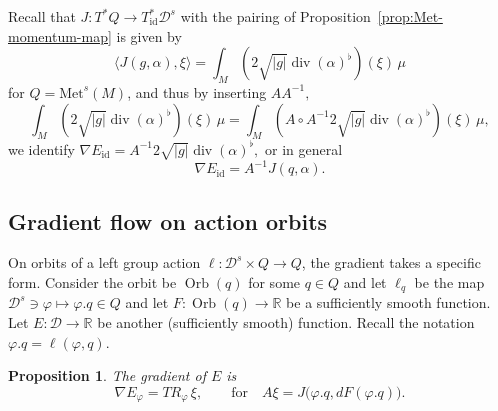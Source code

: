 \documentclass[a5paper,10pt,twoside]{article}
\newcommand{\R}{\ensuremath{\mathbb{R}}}
\newcommand{\cD}{\ensuremath{\mathcal{D}}}
\newcommand{\Met}{\ensuremath{\mathrm{Met}}}
\DeclareMathOperator*{\Orb}{Orb}
\DeclareMathOperator*{\Div}{div}
\DeclareMathOperator*{\id}{id}
\theoremstyle{plain}
\newtheorem{prop}[teo]{Proposition}
\theoremstyle{definition}
\theoremstyle{remark}
\begin{document}
Recall that $J:T^*Q\to T_{\id}^*\cD^s$ with the pairing of Proposition~\ref{prop:Met-momentum-map} is given by
\[
\langle J(g,\alpha),\xi\rangle=\int_M \left(2\sqrt{|g|}\Div(\alpha)^\flat\right)(\xi)\,\mu
\]
for $Q=\Met^s(M)$, and thus by inserting $AA^{-1},$
\[
\int_M \left(2\sqrt{|g|}\Div(\alpha)^\flat\right)(\xi)\,\mu = \int_M \left(A\circ A^{-1}2\sqrt{|g|}\Div(\alpha)^\flat\right)(\xi)\,\mu,
\]
we identify $\nabla E_{\id}=A^{-1}2\sqrt{|g|}\Div(\alpha)^\flat,$ or in general 
%
\begin{equation}
\nabla E_{\id}=A^{-1}J(q,\alpha).
\end{equation}
%







\subsection{Gradient flow on action orbits}

%

On orbits of a left group action $\ell: \cD^s\times Q\to Q$, the gradient takes a specific form. Consider the orbit be $\Orb(q)$ for some $q\in Q$ and let $\ell_q$ be the map $\cD^s\ni \varphi\mapsto\varphi.q\in Q$ and let $F:\Orb(q)\to\R$ be a sufficiently smooth function.
Let $E:\cD\to\R$ be another (sufficiently smooth) function. Recall the notation $\varphi.q=\ell(\varphi,q)$.

\begin{prop}
 The gradient of $E$ is
\[
\nabla E_\varphi = TR_{\varphi}\,\xi,\qquad\mathrm{for}\quad A\xi=J\big(\varphi.q,dF(\varphi.q)\big).
\]
\end{prop}
\end{document}
